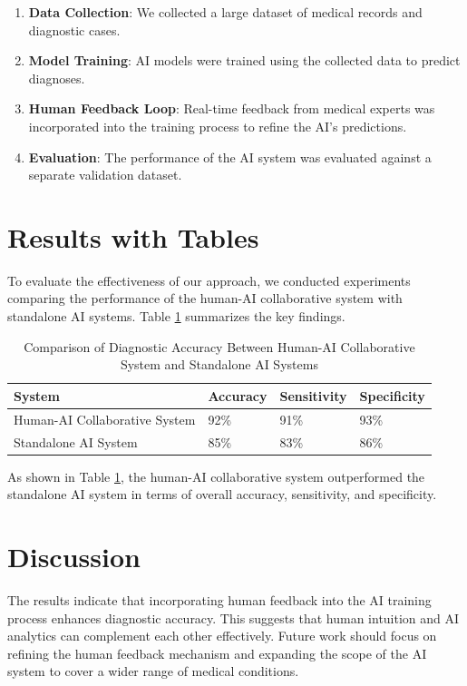 \documentclass{article}
\begin{document}
\begin{enumerate}
    \item \textbf{Data Collection}: We collected a large dataset of medical records and diagnostic cases.
    \item \textbf{Model Training}: AI models were trained using the collected data to predict diagnoses.
    \item \textbf{Human Feedback Loop}: Real-time feedback from medical experts was incorporated into the training process to refine the AI's predictions.
    \item \textbf{Evaluation}: The performance of the AI system was evaluated against a separate validation dataset.
\end{enumerate}

\section{Results with Tables}
To evaluate the effectiveness of our approach, we conducted experiments comparing the performance of the human-AI collaborative system with standalone AI systems. Table \ref{tab:results} summarizes the key findings.

\begin{table}[ht]
    \centering
    \caption{Comparison of Diagnostic Accuracy Between Human-AI Collaborative System and Standalone AI Systems}
    \label{tab:results}
    \begin{tabular}{@{}llll@{}}
    \toprule
    \textbf{System} & \textbf{Accuracy} & \textbf{Sensitivity} & \textbf{Specificity} \\
    \midrule
    Human-AI Collaborative System & 92\% & 91\% & 93\% \\
    Standalone AI System & 85\% & 83\% & 86\% \\
    \bottomrule
    \end{tabular}
\end{table}

As shown in Table \ref{tab:results}, the human-AI collaborative system outperformed the standalone AI system in terms of overall accuracy, sensitivity, and specificity.

\section{Discussion}
The results indicate that incorporating human feedback into the AI training process enhances diagnostic accuracy. This suggests that human intuition and AI analytics can complement each other effectively. Future work should focus on refining the human feedback mechanism and expanding the scope of the AI system to cover a wider range of medical conditions.
\end{document}
